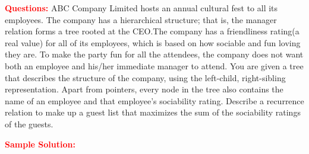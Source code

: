 \problem

\textcolor{Red}{\textbf{Questions:}}
ABC Company Limited hosts an annual cultural fest to all its employees. The company has a hierarchical structure; that is, the manager relation forms a tree rooted at the CEO.The company has a friendliness rating(a real value) for all of its employees, which is based on how sociable and fun loving they are. To make the party fun for all the attendees, the company does not want both an employee and his/her immediate manager to attend. You are given a tree that describes the structure of the company, using the left-child, right-sibling representation. Apart from pointers, every node in the tree also contains the name of an employee and that employee's sociability rating. Describe a recurrence relation to make up a guest list that maximizes the sum of the sociability ratings of the guests.

\textcolor{Red}{\textbf{Sample Solution:}}
